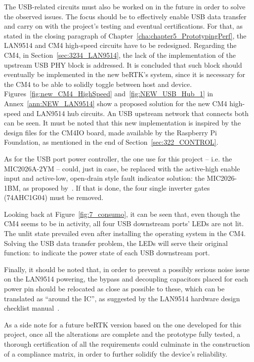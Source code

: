 The USB-related circuits must also be worked on in the future in order to solve the observed issues. The focus should be to effectively enable USB data transfer and carry on with the project's testing and eventual certifications. For that, as stated in the closing paragraph of Chapter~\ref{cha:chapter5_PrototypingPerf}, the LAN9514 and CM4 high-speed circuits have to be redesigned. Regarding the CM4, in Section~\ref{sec:3234_LAN9514}, the lack of the implementation of the upstream USB PHY block is addressed. It is concluded that such block should eventually be implemented in the new beRTK\textsuperscript{\textregistered}'s system, since it is necessary for the CM4 to be able to solidly toggle between host and device. Figures~\ref{fig:new_CM4_HighSpeed} and~\ref{fig:NEW_USB_Hub_1} in Annex~\ref{ann:NEW_LAN9514} show a proposed solution for the new CM4 high-speed and LAN9514 hub circuits. An USB upstream network that connects both can be seen. It must be noted that this new implementation is inspired by the design files for the CM4IO board, made available by the Raspberry Pi Foundation, as mentioned in the end of Section~\ref{sec:322_CONTROL}.

As for the USB port power controller, the one use for this project -- i.e. the MIC2026A-2YM -- could, just in case, be replaced with the active-high enable input and active-low, open-drain style fault indicator solution: the MIC2026-1BM, as proposed by~\cite{LAN9514_ref_schematic}. If that is done, the four single inverter gates (74AHC1G04) must be removed.

Looking back at Figure~\ref{fig:7_consumo}, it can be seen that, even though the CM4 seems to be in activity, all four USB downstream ports' LEDs are not lit. The unlit state prevailed even after installing the operating system in the CM4. Solving the USB data transfer problem, the LEDs will serve their original function: to indicate the power state of each USB downstream port.

Finally, it should be noted that, in order to prevent a possibly serious noise issue on the LAN9514 powering, the bypass and decoupling capacitors placed for each power pin should be relocated as close as possible to these, which can be translated as ``around the IC'', as suggested by the LAN9514 hardware design checklist manual~\cite{LAN9514_HW_Design_Checklist}.

As a side note for a future beRTK\textsuperscript{\textregistered} version based on the one developed for this project, once all the alterations are complete and the prototype fully tested, a thorough certification of all the requirements could culminate in the construction of a compliance matrix, in order to further solidify the device's reliability.




